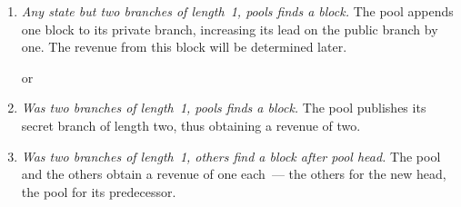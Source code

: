 \documentclass[letterpaper]{llncs}
\begin{document}
\begin{enumerate}[label=(\alph*)] 
\item \emph{Any state but two branches of length~1, pools finds a block.} 
The pool appends one block to its private branch, increasing its lead on the public branch by one. The revenue from this block will be determined later. \label{itm:pool} 

\centerline{
    {\Large \hspace{0.0cm}  \hspace{0.0cm}}
}

or

\centerline{
    {\Large \hspace{0.0cm}  \hspace{0.0cm}}
}

\vspace{0.5\baselineskip}

\item \emph{Was two branches of length~1, pools finds a block.}
The pool publishes its secret branch of length two, thus obtaining a revenue of two. \label{itm:poolPoolZeroPrime} 

\vspace{0.5\baselineskip}

\centerline{
    {\Large \hspace{0.0cm}  \hspace{0.0cm}}
    {\Large \hspace{0.0cm}  \hspace{0.0cm}}
}

\vspace{0.5\baselineskip}

\item \emph{Was two branches of length~1, others find a block after pool head.} 
The pool and the others obtain a revenue of one each~--- the others for the new head, the pool for its predecessor. \label{itm:poolOthersZeroPrime}

\vspace{0.5\baselineskip}


\end{enumerate}
\end{document}
